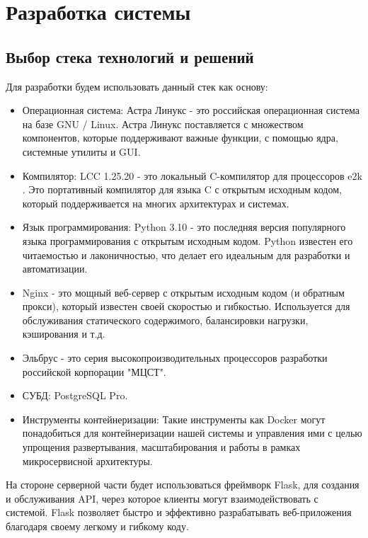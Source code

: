\chapter{Разработка системы}
\label{cha:impl}

\section{Выбор стека технологий и решений}

Для разработки будем использовать данный стек как основу:

\begin{itemize}
    \item Операционная система: Астра Линукс - это российская операционная система на базе GNU / Linux. Астра Линукс поставляется с множеством компонентов, которые поддерживают важные функции, с помощью ядра, системные утилиты и GUI. \cite{dev:astra_linux}
    \item Компилятор: LCC 1.25.20 - это локальный C-компилятор для процессоров e2k \cite{dev:elbrus_lcc}. Это портативный компилятор для языка C с открытым исходным кодом, который поддерживается на многих архитектурах и системах.
    \item Язык программирования: Python 3.10 - это последняя версия популярного языка программирования с открытым исходным кодом. Python известен его читаемостью и лаконичностью, что делает его идеальным для разработки и автоматизации.
    \item Nginx - это мощный веб-сервер с открытым исходным кодом (и обратным прокси), который известен своей скоростью и гибкостью. Используется для обслуживания статического содержимого, балансировки нагрузки, кэширования и т.д.
    \item Эльбрус - это серия высокопроизводительных процессоров разработки российской корпорации "МЦСТ". \cite{dev:elbrus_cpu}
    \item СУБД: PostgreSQL Pro.
    \item Инструменты контейнеризации: Такие инструменты как Docker могут понадобиться для контейнеризации нашей системы и управления ими с целью упрощения развертывания, масштабирования и работы в рамках микросервисной архитектуры.


\end{itemize}

На стороне серверной части будет использоваться фреймворк Flask, для создания и обслуживания API, через которое клиенты могут взаимодействовать с системой. Flask позволяет быстро и эффективно разрабатывать веб-приложения благодаря своему легкому и гибкому коду. 

